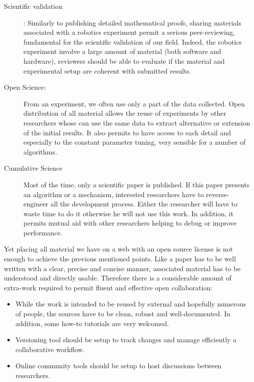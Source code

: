 \begin{description}
    \item[Scientific validation]: Similarly to publishing detailed mathematical proofs, sharing materials associated with a robotics experiment permit a serious peer-reviewing, fundamental for the scientific validation of our field.
    Indeed, the robotics experiment involve a large amount of material (both software and hardware), reviewers should be able to evaluate if the material and experimental setup are coherent with submitted results.

    \item[Open Science:] From an experiment, we often use only a part of the data collected. Open distribution of all material allows the reuse of experiments by other researchers whose can use the same data to extract alternative or extension of the initial results.
    It also permits to have access to each detail and especially to the constant parameter tuning, very sensible for a number of algorithms.

    \item[Cumulative Science] Most of the time, only a scientific paper is published. If this paper presents an algorithm or a mechanism, interested researchers have to reverse-engineer all the development process. Either the researcher will have to waste time to do it otherwise he will not use this work.
    In addition, it permits mutual aid with other researchers helping to debug or improve performance.

\end{description}


Yet placing all material we have on a web with an open source license is not enough to achieve the previous mentioned points. Like a paper has to be well written with a clear, precise and concise manner, associated material has to be understood and directly usable.
Therefore there is a considerable amount of extra-work required to permit fluent and effective open collaboration:
\begin{itemize}
    \item While the work is intended to be reused by external and hopefully numerous of people, the sources have to be clean, robust and well-documented. In addition, some how-to tutorials are very welcomed.
    \item Versioning tool should be setup to track changes and manage efficiently a collaborative workflow.
    \item Online community tools should be setup to host discussions between researchers.
\end{itemize}

